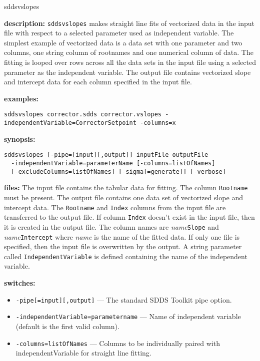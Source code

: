\begin{sddsprog}{sddsvslopes}
  \item \textbf{description:}
    \verb|sddsvslopes| makes straight line fits of vectorized data in the input file with respect to a selected parameter used as independent variable. The simplest example of vectorized data is a data set with one parameter and two columns, one string column of rootnames and one numerical column of data. The fitting is looped over rows across all the data sets in the input file using a selected parameter as the independent variable. The output file contains vectorized slope and intercept data for each column specified in the input file.
  \item \textbf{examples:}
    \begin{verbatim}
sddsvslopes corrector.sdds corrector.vslopes -independentVariable=CorrectorSetpoint -columns=x
    \end{verbatim}
  \item \textbf{synopsis:}
    \begin{verbatim}
sddsvslopes [-pipe=[input][,output]] inputFile outputFile
  -independentVariable=parameterName [-columns=listOfNames]
  [-excludeColumns=listOfNames] [-sigma[=generate]] [-verbose]
    \end{verbatim}
  \item \textbf{files:}
  The input file contains the tabular data for fitting. The column \verb|Rootname| must be present. The output file contains one data set of vectorized slope and intercept data. The \verb|Rootname| and \verb|Index| columns from the input file are transferred to the output file. If column \verb|Index| doesn't exist in the input file, then it is created in the output file. The column names are \emph{name}\verb|Slope| and \emph{name}\verb|Intercept| where \emph{name} is the name of the fitted data. If only one file is specified, then the input file is overwritten by the output. A string parameter called \verb|IndependentVariable| is defined containing the name of the independent variable.
  \item \textbf{switches:}
    \begin{itemize}
      \item \verb|-pipe[=input][,output]| --- The standard SDDS Toolkit pipe option.
      \item \verb|-independentVariable=parametername| --- Name of independent variable (default is the first valid column).
      \item \verb|-columns=listOfNames| --- Columns to be individually paired with independentVariable for straight line fitting.

\end{itemize}
\end{sddsprog}
